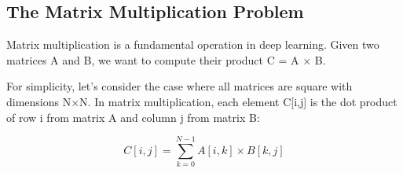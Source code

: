 \subsection{The Matrix Multiplication Problem}

Matrix multiplication is a fundamental operation in deep learning. Given two matrices A and B, we want to compute their product C = A × B.

For simplicity, let's consider the case where all matrices are square with dimensions N×N. In matrix multiplication, each element C[i,j] is the dot product of row i from matrix A and column j from matrix B:

\begin{equation}
C[i,j] = \sum_{k=0}^{N-1} A[i,k] \times B[k,j]
\end{equation}


